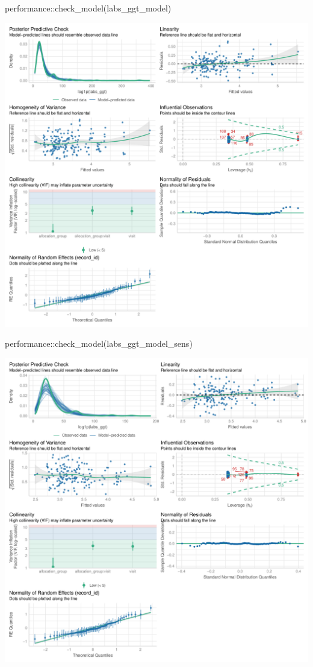\documentclass[
  12pt,
]{article}
\newenvironment{Shaded}{\begin{snugshade}}{\end{snugshade}}
\newcommand{\FunctionTok}[1]{\textcolor[rgb]{0.28,0.35,0.67}{#1}}
\newcommand{\NormalTok}[1]{\textcolor[rgb]{0.00,0.23,0.31}{#1}}
\newcommand{\SpecialCharTok}[1]{\textcolor[rgb]{0.37,0.37,0.37}{#1}}
\begin{document}
\begin{Shaded}
\begin{Highlighting}[]
\NormalTok{performance}\SpecialCharTok{::}\FunctionTok{check\_model}\NormalTok{(labs\_ggt\_model)}
\end{Highlighting}
\end{Shaded}

\includegraphics{Outcomes_files/figure-pdf/labs_ggt_4-1.pdf}

\begin{Shaded}
\begin{Highlighting}[]
\NormalTok{performance}\SpecialCharTok{::}\FunctionTok{check\_model}\NormalTok{(labs\_ggt\_model\_sens)}
\end{Highlighting}
\end{Shaded}

\includegraphics{Outcomes_files/figure-pdf/labs_ggt_4-2.pdf}
\end{document}
